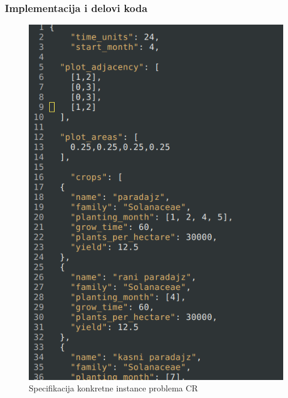 \documentclass{beamer}
\begin{document}
\begin{frame}

  \frametitle{Implementacija i delovi koda}

  \begin{figure}
    \includegraphics[height=0.7\textheight]{slike/problem_spec.png}
    \caption{Specifikacija konkretne instance problema CR}
  \end{figure}

\end{frame}
\end{document}
